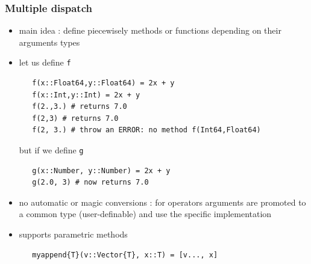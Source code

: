 \documentclass[11pt,mathserif]{beamer}
\begin{document}

\begin{frame}[fragile]
\frametitle{Multiple dispatch}
\begin{itemize}
   \pause
   \item main idea : define piecewisely methods or functions depending on their arguments types
   \pause
   \item let us define \texttt{f}
   \begin{lstlisting}
   f(x::Float64,y::Float64) = 2x + y
   f(x::Int,y::Int) = 2x + y
   f(2.,3.) # returns 7.0
   f(2,3) # returns 7.0
   f(2, 3.) # throw an ERROR: no method f(Int64,Float64)
   \end{lstlisting}
   \pause
   but if we define \texttt{g}
   \begin{lstlisting}
   g(x::Number, y::Number) = 2x + y
   g(2.0, 3) # now returns 7.0
   \end{lstlisting}
   \pause
   \item no automatic or magic conversions : for operators 
    arguments are promoted to a common type (user-definable) and
    use the specific implementation
   \pause
   \item supports parametric methods
   \begin{lstlisting}
   myappend{T}(v::Vector{T}, x::T) = [v..., x] 
   \end{lstlisting}
\end{itemize}
\end{frame}

\end{document}
